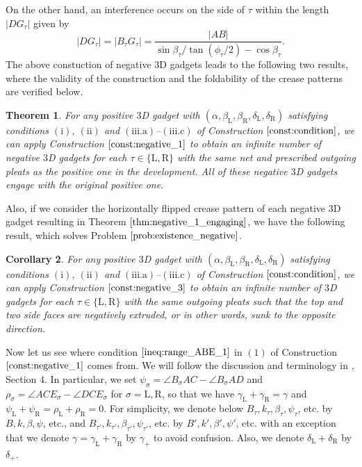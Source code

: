 \documentclass[11pt]{amsart}
\newtheorem{theorem}{Theorem}
\newtheorem{corollary}[theorem]{Corollary}
\numberwithin{equation}{section}
\numberwithin{theorem}{section}
\newcommand{\Lt}{\ensuremath{\mathrm{L}}}
\newcommand{\Rt}{\ensuremath{\mathrm{R}}}
\newcommand{\norm}[1]{\ensuremath{\left| #1 \right|}}
\begin{document}
On the other hand, an interference occurs on the side of $\tau$ within the length $\norm{D G_\tau}$ given by
\begin{equation*}
\norm{DG_\tau}=\norm{B_\tau G_\tau}=\frac{\norm{AB}}{\sin\beta_\tau /\tan (\phi_\tau /2)-\cos\beta_\tau}. 
\end{equation*}
The above constuction of negative $3$D gadgets leads to the following two results,
where the validity of the construction and the foldability of the crease patterns are verified below.
\begin{theorem}\label{thm:negative_1_engaging}
For any positive $3$D gadget with $(\alpha ,\beta_\Lt ,\beta_\Rt ,\delta_\Lt ,\delta_\Rt )$
satisfying conditions $(\mathrm{i})$, $(\mathrm{ii})$ and $(\mathrm{iii.a})$--$(\mathrm{iii.c})$ of Construction $\ref{const:condition}$, 
we can apply Construction $\ref{const:negative_1}$ to obtain an infinite number of negative $3$D gadgets for each $\tau\in\{\Lt ,\Rt\}$
with the same net and prescribed outgoing pleats as the positive one in the development.
All of these negative $3$D gadgets engage with the original positive one.
\end{theorem}
Also, if we consider the horizontally flipped crease pattern of each negative $3$D gadget
resulting in Theorem $\ref{thm:negative_1_engaging}$, we have the following result, which solves Problem $\ref{prob:existence_negative}$.
\begin{corollary}
For any positive $3$D gadget with $(\alpha ,\beta_\Lt ,\beta_\Rt ,\delta_\Lt ,\delta_\Rt )$
satisfying conditions $(\mathrm{i})$, $(\mathrm{ii})$ and $(\mathrm{iii.a})$--$(\mathrm{iii.c})$ of Construction $\ref{const:condition}$,
we can apply Construction $\ref{const:negative_3}$ to obtain an infinite number of $3$D gadgets for each $\tau\in\{\Lt ,\Rt\}$
with the same outgoing pleats such that the top and two side faces are negatively extruded, or in other words, sunk to the opposite direction.
\end{corollary}

Now let us see where condition $\eqref{ineq:range_ABE_1}$ in $(1)$ of Construction $\ref{const:negative_1}$ comes from.
We will follow the discussion and terminology in \cite{Doi20}, Section $4$.
In particular, we set $\psi_\sigma =\angle B_\sigma AC-\angle B_\sigma AD$ and $\rho_\sigma =\angle ACE_\sigma -\angle DCE_\sigma$ for $\sigma =\Lt ,\Rt$,
so that we have $\gamma_\Lt +\gamma_\Rt =\gamma$ and $\psi_\Lt +\psi_\Rt =\rho_\Lt +\rho_\Rt =0$.
For simplicity, we denote below $B_\tau ,k_\tau ,\beta_\tau ,\psi_\tau$, etc. by $B,k,\beta ,\psi$, etc.,
and $B_{\tau'},k_{\tau'},\beta_{\tau'},\psi_{\tau'}$, etc. by $B',k',\beta',\psi'$, etc. 
with an exception that we denote $\gamma =\gamma_\Lt +\gamma_\Rt$ by $\gamma_+$ to avoid confusion.
Also, we denote $\delta_\Lt +\delta_\Rt$ by $\delta_+$.
\end{document}
